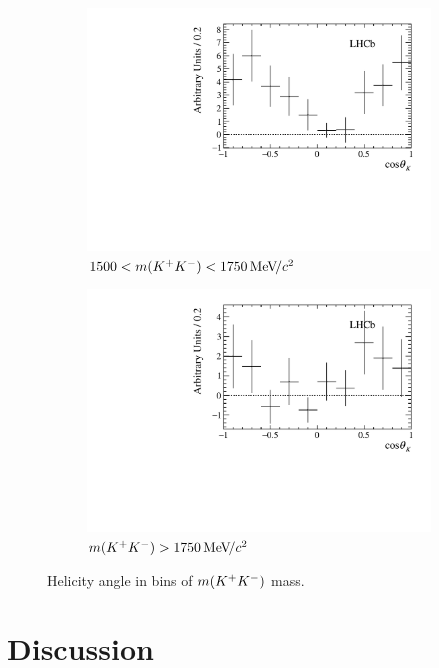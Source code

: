 \begin{figure}[!h]
\begin{subfigure}[t]{0.49\textwidth}
        \includegraphics[width=1.0\textwidth]{figs/B2DsKK/helAngle_bin3_sweighted.pdf}
        \caption{$1500<m({{K}^+}{{K}^-})<1750{\mathrm{\,Me\kern -0.1em V\!/}c^2}$}
    \end{subfigure}
    \begin{subfigure}[t]{0.49\textwidth}
        \includegraphics[width=1.0\textwidth]{figs/B2DsKK/helAngle_bin4_sweighted.pdf}
        \caption{$m({{K}^+}{{K}^-})>1750{\mathrm{\,Me\kern -0.1em V\!/}c^2}$}
    \end{subfigure}
    \caption{Helicity angle in bins of $m({{K}^+}{{K}^-})$ mass.}
    \label{fig:B2DsKK_twobodyprojections}
\end{figure}


\section{Discussion}
